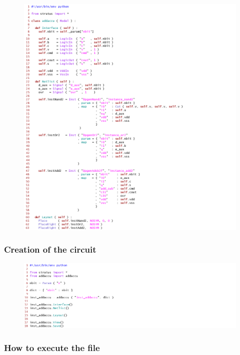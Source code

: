 \begin{figure}[hbp]
\centering
\includegraphics[width=1.2\textwidth]{images/addaccu.png}
\end{figure}

\newpage

\subsubsection{Creation of the circuit}

\begin{figure}[hbp]
\centering
\includegraphics[width=1.3\textwidth]{images/test.png}
\end{figure}

  
\subsubsection{How to execute the file}

